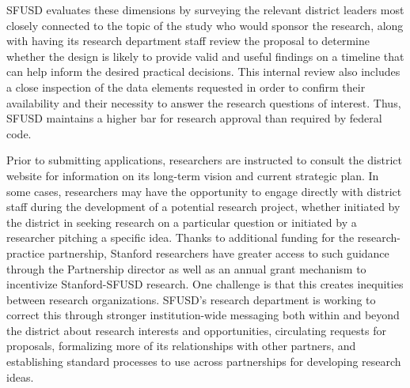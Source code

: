 \documentclass[
]{book}
\begin{document}
SFUSD evaluates these dimensions by surveying the relevant district leaders most closely connected to the topic of the study who would sponsor the research, along with having its research department staff review the proposal to determine whether the design is likely to provide valid and useful findings on a timeline that can help inform the desired practical decisions. This internal review also includes a close inspection of the data elements requested in order to confirm their availability and their necessity to answer the research questions of interest. Thus, SFUSD maintains a higher bar for research approval than required by federal code.

Prior to submitting applications, researchers are instructed to consult the district website for information on its long-term vision and current strategic plan. In some cases, researchers may have the opportunity to engage directly with district staff during the development of a potential research project, whether initiated by the district in seeking research on a particular question or initiated by a researcher pitching a specific idea. Thanks to additional funding for the research-practice partnership, Stanford researchers have greater access to such guidance through the Partnership director as well as an annual grant mechanism to incentivize Stanford-SFUSD research. One challenge is that this creates inequities between research organizations. SFUSD's research department is working to correct this through stronger institution-wide messaging both within and beyond the district about research interests and opportunities, circulating requests for proposals, formalizing more of its relationships with other partners, and establishing standard processes to use across partnerships for developing research ideas.
\end{document}

